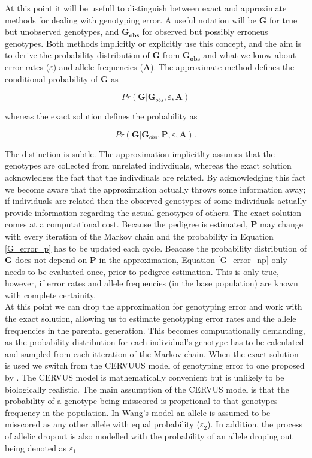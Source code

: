 \documentclass{article}
\begin{document}
At this point it will be usefull to distinguish between exact and approximate methods for dealing with genotyping error.  A useful notation will be $\bm{G}$ for true but unobserved genotypes, and $\bm{G_{obs}}$ for observed but possibly erroneus genotypes.  Both methods implicitly or explicitly use this concept, and the aim is to derive the probability distribution of $\bm{G}$ from $\bm{G_{obs}}$ and what we know about error rates ($\varepsilon$) and allele frequencies ($\bm{A}$).  The approximate method defines the conditional probability of $\bm{G}$ as

\begin{equation}
Pr({\bm G} | {\bm G}_{obs}, {\varepsilon}, {\bm A})
\label{G_error_np}
\end{equation}

whereas the exact solution defines the probability as

\begin{equation}
Pr({\bm G} | {\bm G}_{obs}, {\bm P}, {\varepsilon}, {\bm A}).
\label{G_error_p}
\end{equation}

The distinction is subtle.  The approximation implicitlty assumes that the genotypes are collected from unrelated indivdiuals, whereas the exact solution acknowledges the fact that the indivdiuals are related.  By acknowledging this fact we become aware that the approximation actually throws some information away; if individuals are related then the observed genotypes of some individuals actually provide information regarding the actual genotypes of others. The exact solution comes at a computational cost.  Because the pedigree is estimated, ${\bm P}$ may change with every iteration of the Markov chain and the probability in Equation \ref{G_error_p} has to be updated each cycle.  Beacase the probability distribution of $\bm{G}$ does not depend on $\bm{P}$ in the approximation, Equation \ref{G_error_np} only needs to be evaluated once, prior to pedigree estimation.  This is only true, however, if error rates and allele frequencies (in the base population) are known with complete certainity.\\


 At this point we can drop the approximation for genotyping error and work with the exact solution, allowing us to estimate genotyping error rates and the allele frequencies in the parental generation. This becomes computationally demanding, as the probability distribution for each individual's genotype has to be calculated and sampled from each itteration of the Markov chain.  When the exact solution is used we switch from the CERVUUS model of genotyping error to one proposed by \citep{Wang.2004}.  The CERVUS model is mathematically convenient but is unlikely to be biologically realistic.  The main assumption of the CERVUS model is that the probability of a genotype being misscored is proprtional to that genotypes frequency in the population.  In Wang's model an allele is assumed to be misscored as any other allele with equal probability ($\varepsilon_{2}$).  In addition, the process of allelic dropout is also modelled with the probability of an allele droping out being denoted as $\varepsilon_{1}$
\end{document}
